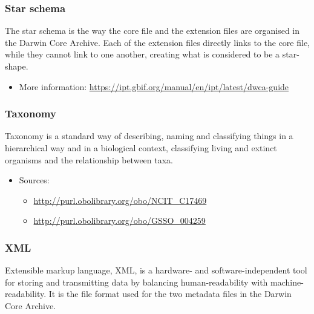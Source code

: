 \documentclass[
]{book}
\providecommand{\tightlist}{%
  \setlength{\itemsep}{0pt}\setlength{\parskip}{0pt}}
\begin{document}
\hypertarget{starschema}{%
\subsubsection*{Star schema}\label{starschema}}

The star schema is the way the core file and the extension files are organised in the Darwin Core Archive. Each of the extension files directly links to the core file, while they cannot link to one another, creating what is considered to be a star-shape.

\begin{itemize}
\tightlist
\item
  More information: \url{https://ipt.gbif.org/manual/en/ipt/latest/dwca-guide}
\end{itemize}

\hypertarget{taxonomy}{%
\subsubsection*{Taxonomy}\label{taxonomy}}

Taxonomy is a standard way of describing, naming and classifying things in a hierarchical way and in a biological context, classifying living and extinct organisms and the relationship between taxa.

\begin{itemize}
\tightlist
\item
  Sources:

  \begin{itemize}
  \tightlist
  \item
    \url{http://purl.obolibrary.org/obo/NCIT_C17469}
  \item
    \url{http://purl.obolibrary.org/obo/GSSO_004259}
  \end{itemize}
\end{itemize}

\hypertarget{XML}{%
\subsubsection*{XML}\label{XML}}

Extensible markup language, XML, is a hardware- and software-independent tool for storing and transmitting data by balancing human-readability with machine-readability. It is the file format used for the two metadata files in the Darwin Core Archive.
\end{document}
